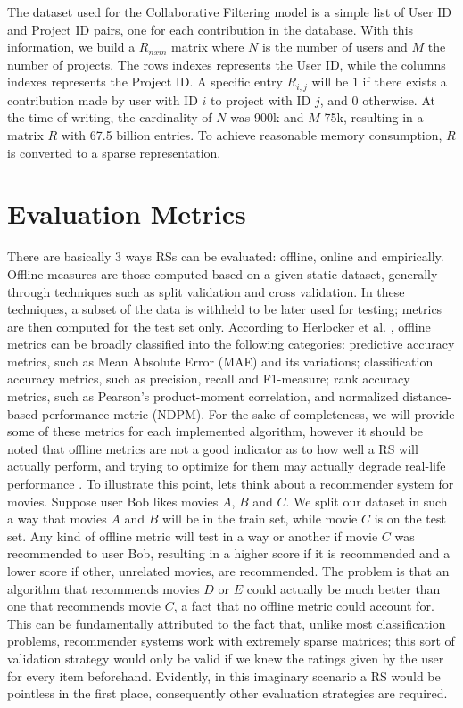 \documentclass[cic,tc,english]{iiufrgs}
\begin{document}
The dataset used for the Collaborative Filtering model is a simple list of User ID and Project ID pairs, one for each contribution in the database. With this information, we build a \(R_{nxm}\) matrix where $N$ is the number of users and $M$ the number of projects. The rows indexes represents the User ID, while the columns indexes represents the Project ID. A specific entry $R_{i,j}$ will be $1$ if there exists a contribution made by user with ID $i$ to project with ID $j$, and $0$ otherwise. At the time of writing, the cardinality of $N$ was 900k and $M$ 75k, resulting in a matrix $R$ with 67.5 billion entries. To achieve reasonable memory consumption, $R$ is converted to a sparse representation.

\section{Evaluation Metrics}
There are basically 3 ways RSs can be evaluated: offline, online and empirically. Offline measures are those computed based on a given static dataset, generally through techniques such as split validation and cross validation. In these techniques, a subset of the data is withheld to be later used for testing; metrics are then computed for the test set only. According to Herlocker et al. \cite{Herlocker2004}, offline metrics can be broadly classified into the following categories: predictive accuracy metrics, such as Mean Absolute Error (MAE) and its variations; classification accuracy metrics, such as precision, recall and F1-measure; rank accuracy metrics, such as Pearson’s product-moment correlation, and normalized distance-based performance metric (NDPM). For the sake of completeness, we will provide some of these metrics for each implemented algorithm, however it should be noted that offline metrics are not a good indicator as to how well a RS will actually perform, and trying to optimize for them may actually degrade real-life performance \cite{McNee2006}. To illustrate this point, lets think about a recommender system for movies. Suppose user Bob likes movies $A$, $B$ and $C$. We split our dataset in such a way that movies $A$ and $B$ will be in the train set, while movie $C$ is on the test set. Any kind of offline metric will test in a way or another if movie $C$ was recommended to user Bob, resulting in a higher score if it is recommended and a lower score if other, unrelated movies, are recommended. The problem is that an algorithm that recommends movies $D$ or $E$ could actually be much better than one that recommends movie $C$, a fact that no offline metric could account for. This can be fundamentally attributed to the fact that, unlike most classification problems, recommender systems work with extremely sparse matrices; this sort of validation strategy would only be valid if we knew the ratings given by the user for every item beforehand. Evidently, in this imaginary scenario a RS would be pointless in the first place, consequently other evaluation strategies are required.
\end{document}

